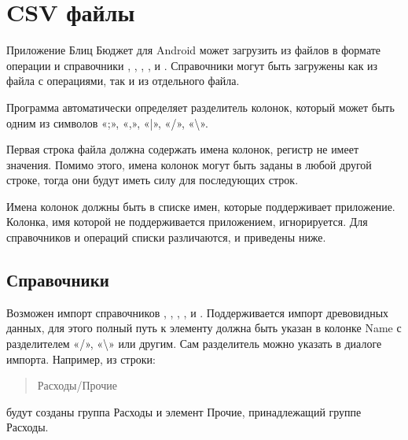 \documentclass[a4paper,10pt,russian]{sphinxmanual}
\begin{document}
\noindent{}

\noindent{}


\section{CSV файлы}
\label{\detokenize{import:id3}}
\sphinxAtStartPar
Приложение Блиц Бюджет для Android может загрузить из файлов в формате  операции и справочники
, , , ,  и .
Справочники могут быть загружены как из файла с операциями, так и из отдельного
файла.

\sphinxAtStartPar
Программа автоматически определяет разделитель колонок, который может быть одним из символов «;», «,», «|», «/», «\textbackslash{}».

\sphinxAtStartPar
Первая строка файла должна содержать имена колонок, регистр не имеет значения. Помимо этого, имена
колонок могут быть заданы в любой другой строке, тогда они будут иметь силу для последующих строк.

\sphinxAtStartPar
Имена колонок должны быть в списке имен, которые поддерживает приложение. Колонка, имя которой не поддерживается
приложением, игнорируется. Для справочников и операций списки различаются, и приведены ниже.


\subsection{Справочники}
\label{\detokenize{import:id4}}
\sphinxAtStartPar
Возможен импорт справочников , , , ,  и .
Поддерживается импорт древовидных данных, для этого полный путь к элементу должна быть указан в колонке Name с разделителем «/», «\textbackslash{}» или другим.
Сам разделитель можно указать в диалоге импорта. Например, из строки:
\begin{quote}

\sphinxAtStartPar
Расходы/Прочие
\end{quote}

\sphinxAtStartPar
будут созданы группа Расходы и элемент Прочие, принадлежащий группе Расходы.
\end{document}

